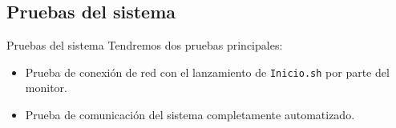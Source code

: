 \documentclass[aspectratio=169]{beamer}
\begin{document}
\subsection{Pruebas del sistema}
\begin{frame}{Pruebas del sistema}
	Tendremos dos pruebas principales:
	\begin{itemize}
		\item Prueba de conexión de red con el lanzamiento de \texttt{Inicio.sh} por parte del monitor.
		\item Prueba de comunicación del sistema completamente automatizado.
	\end{itemize}
\end{frame}
%
%
%
\end{document}
